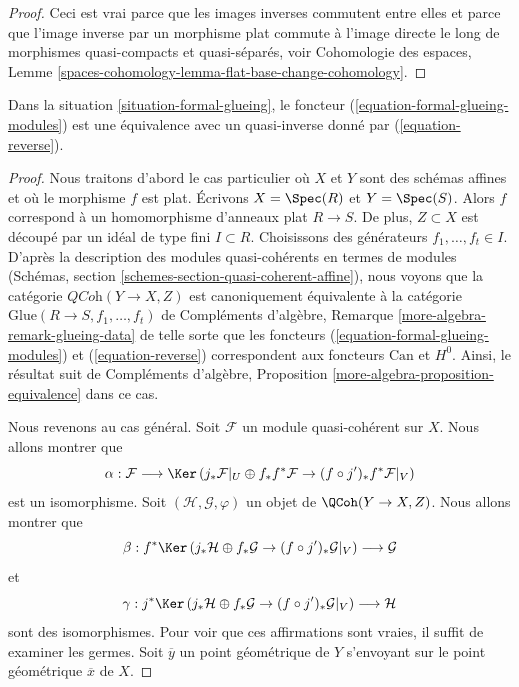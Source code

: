 \begin{proof}
Ceci est vrai parce que les images inverses commutent entre elles et parce que l'image inverse par un morphisme plat commute à l'image directe le long de morphismes quasi-compacts et quasi-séparés, voir Cohomologie des espaces, Lemme \ref{spaces-cohomology-lemma-flat-base-change-cohomology}.
\end{proof}

\begin{proposition}
\label{proposition-formal-glueing-modules}
Dans la situation \ref{situation-formal-glueing}, le foncteur
(\ref{equation-formal-glueing-modules}) est une équivalence
avec un quasi-inverse donné par (\ref{equation-reverse}).
\end{proposition}

\begin{proof}
Nous traitons d'abord le cas particulier où $X$ et $Y$ sont des schémas affines
et où le morphisme $f$ est plat. Écrivons $X = \Spec(R)$ et $Y = \Spec(S)$.
Alors $f$ correspond à un homomorphisme d'anneaux plat $R \to S$. De plus, $Z \subset X$
est découpé par un idéal de type fini $I \subset R$. Choisissons des générateurs $f_1, \ldots, f_t \in I$.
D'après la description des modules quasi-cohérents
en termes de modules
(Schémas, section \ref{schemes-section-quasi-coherent-affine}),
nous voyons que la catégorie $\textit{QCoh}(Y \to X, Z)$
est canoniquement équivalente à la catégorie
$\text{Glue}(R \to S, f_1, \ldots, f_t)$
de Compléments d'algèbre, Remarque \ref{more-algebra-remark-glueing-data}
de telle sorte que les foncteurs
(\ref{equation-formal-glueing-modules}) et (\ref{equation-reverse})
correspondent aux foncteurs $\text{Can}$ et $H^0$.
Ainsi, le résultat suit de
Compléments d'algèbre, Proposition \ref{more-algebra-proposition-equivalence}
dans ce cas.

\medskip\noindent
Nous revenons au cas général.
Soit $\mathcal{F}$ un module quasi-cohérent sur $X$.
Nous allons montrer que
$$
\alpha :
\mathcal{F}
\longrightarrow
\Ker\left(j_*\mathcal{F}|_U \oplus f_*f^*\mathcal{F} \to
(f \circ j')_*f^*\mathcal{F}|_V\right)
$$
est un isomorphisme. Soit $(\mathcal{H}, \mathcal{G}, \varphi)$
un objet de $\QCoh(Y \to X, Z)$. Nous allons montrer que
$$
\beta :
f^*\Ker\left(
j_*\mathcal{H} \oplus f_*\mathcal{G} \to (f \circ j')_*\mathcal{G}|_V
\right)
\longrightarrow
\mathcal{G}
$$
et
$$
\gamma :
j^*\Ker\left(
j_*\mathcal{H} \oplus f_*\mathcal{G} \to (f \circ j')_*\mathcal{G}|_V
\right)
\longrightarrow
\mathcal{H}
$$
sont des isomorphismes. Pour voir que ces affirmations sont vraies, il suffit de
examiner les germes. Soit $\overline{y}$ un point géométrique de $Y$ s'envoyant
sur le point géométrique $\overline{x}$ de $X$.


\end{proof}

